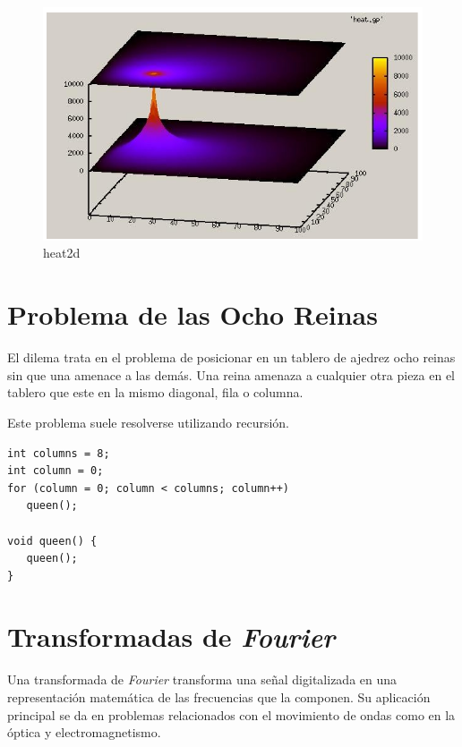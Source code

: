 \documentclass[a4paper]{report}
\begin{document}
\begin{figure}[H]
\begin{center}
\includegraphics[width=12cm]{heat2d.png}
\caption{heat2d}
\end{center}
\end{figure}

\section{Problema de las Ocho Reinas}

El dilema trata en el problema de posicionar en un tablero de ajedrez ocho
reinas sin que una amenace a las dem\'as. Una reina amenaza a cualquier otra
pieza en el tablero que este en la mismo diagonal, fila o columna.

\bigskip

Este problema suele resolverse utilizando recursi\'on.

\begin{verbatim}
int columns = 8;
int column = 0;
for (column = 0; column < columns; column++)
   queen();

void queen() {
   queen();
}
\end{verbatim}

\section{Transformadas de {\it Fourier}}

Una transformada de {\it Fourier} \cite{fourier} transforma una se\~nal
digitalizada en una representaci\'on matem\'atica de las frecuencias que la
componen. Su aplicaci\'on principal se da en problemas relacionados con el
movimiento de ondas como en la \'optica y electromagnetismo.

\bigskip
\end{document}
